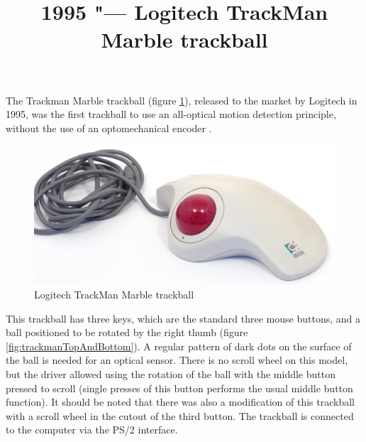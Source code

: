 \documentclass[11pt, a4paper]{article}
\begin{document}
\title{1995 "--- Logitech TrackMan Marble trackball}
\date{}
\maketitle

The Trackman Marble trackball (figure \ref{fig:trackman}), released to the market by Logitech in 1995, was the first trackball to use an all-optical motion detection principle, without the use of an optomechanical encoder \cite{logitech25}.

\begin{figure}[h]
    \centering
    \includegraphics[scale=0.4]{1995_logitech_trackman/pic_60.jpg}
    \caption{Logitech TrackMan Marble trackball}
    \label{fig:trackman}
\end{figure}

This trackball has three keys, which are the standard three mouse buttons, and a ball positioned to be rotated by the right thumb (figure \ref{fig:trackmanTopAndBottom}). A regular pattern of dark dots on the surface of the ball is needed for an optical sensor. There is no scroll wheel on this model, but the driver allowed using the rotation of the ball with the middle button pressed to scroll (single presses of this button performs the usual middle button function). It should be noted that there was also a modification of this trackball with a scroll wheel in the cutout of the third button. The trackball is connected to the computer via the PS/2 interface.
\end{document}
